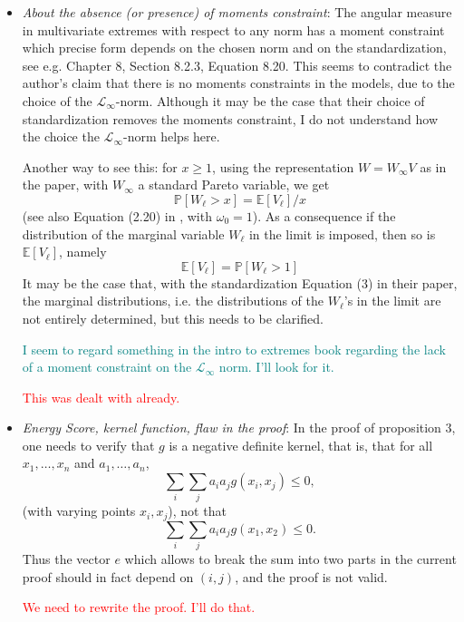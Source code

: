 \documentclass[10pt]{article}
\newcommand{\comment}[1]{\textcolor{teal}{#1}}
\newcommand{\bruno}[1]{\textcolor{red}{#1}}
\begin{document}
\begin{itemize}
\begin{enumerate}
        \end{enumerate}

    \item \emph{About the absence (or presence) of moments constraint}: The angular measure in
    multivariate extremes with respect to any norm has a moment constraint which precise form depends 
    on the chosen norm and on the standardization, see e.g. 
    \cite{beirlant2006} Chapter 8, Section 8.2.3, Equation 8.20. 
    This seems to contradict the author’s claim that there is no moments constraints in the models, 
    due to the choice of the $\mathcal{L}_{\infty}$-norm. Although it may be the case that their choice
    of standardization removes the moments constraint, I do not understand how the choice the 
    $\mathcal{L}_{\infty}$-norm helps here.

    Another way to see this: for $x \geq 1$, using the representation $W = W_{\infty}V$ as in the
    paper, with $W_{\infty}$ a standard Pareto variable, we get 
    \[\mathbb{P}\left[W_{\ell} > x\right] = \mathbb{E}\left[V_{\ell}\right] / x\]
    (see also Equation (2.20) in \cite{ferreira2014}, with $\omega_0 = 1$).  As a consequence if 
    the distribution of the marginal variable $W_{\ell}$ in the limit is imposed, then so is 
    $\mathbb{E}\left[V_{\ell}\right]$, namely 
    \[ \mathbb{E}\left[V_{\ell}\right] = \mathbb{P}\left[W_{\ell} > 1\right] \]
    It may be the case that, with the standardization Equation (3) in their paper, the marginal
    distributions, i.e. the distributions of the $W_{\ell}$’s in the limit are not entirely determined, 
    but this needs to be clarified.

    \comment{I seem to regard something in the intro to extremes book regarding the lack of a
    moment constraint on the $\mathcal{L}_{\infty}$ norm.  I'll look for it.}

    \bruno{This was dealt with already.}

    \item \emph{Energy Score, kernel function, flaw in the proof}: In the proof of proposition 3, 
    one needs to verify that $g$ is a negative definite kernel, that is, that for all $x_1,\ldots,x_n$
    and $a_1,\ldots,a_n$, \[ \sum_i\sum_ja_ia_jg(x_i,x_j)\leq 0,\]
    (with varying points $x_i,x_j$), not that \[\sum_i\sum_ja_ia_jg(x_1,x_2)\leq 0.\]  Thus the vector $e$
    which allows to break the sum into two parts in the current proof should in fact depend on $(i,j)$, and the proof is not valid.

    \bruno{We need to rewrite the proof. I'll do that.}


\end{itemize}
\end{document}
